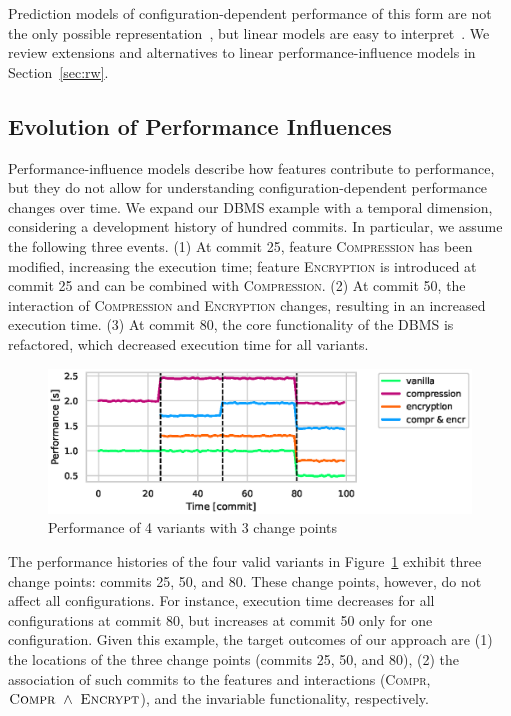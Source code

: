 \documentclass[sigconf, screen]{acmart}
\begin{document}
	Prediction models of configuration-dependent performance of this form are not the only possible representation~\cite{guoVariabilityawarePerformancePrediction2013,haDeepPerf2019}, but linear models are easy to interpret~\cite{siegmundPerformanceinfluenceModelsHighly2015}.
	We review extensions and alternatives to linear performance-influence models in Section~\ref{sec:rw}.
	
	\subsection{Evolution of Performance Influences}
	Performance-influence models describe how features contribute to performance, but they do not allow for understanding configuration-dependent performance changes over time.
	We expand our DBMS example with a temporal dimension, considering a development history of hundred commits.
	In particular, we assume the following three events. (1) At commit 25, feature \textsc{Compression} has been modified, increasing the execution time; feature \textsc{Encryption} is introduced at commit 25 and can be combined with \textsc{Compression}. (2) At commit 50, the interaction of \textsc{Compression} and \textsc{Encryption} changes, resulting in an increased execution time. (3) At commit 80, the core functionality of the DBMS is refactored, which decreased execution time for all variants.
	\begin{figure}[ht!]
		\centering
		\includegraphics[width=\linewidth]{images/dbms_performance.eps}
		\caption{Performance of 4 variants with 3 change points}
		\label{fig:dbms_performance}
	\end{figure}
	
	The performance histories of the four valid variants in Figure~\ref{fig:dbms_performance} exhibit three change points: commits 25, 50, and 80. These change points, however, do not affect all configurations.
	For  instance, execution time decreases for all configurations at commit 80, but increases at commit 50 only for one configuration.
	Given this example, the target outcomes of our approach are (1) the locations of the three change points (commits 25, 50, and 80),  (2) the association of such commits to the features and interactions (\textsc{Compr}, $\text{\textsc{Compr}}\ \land\ \text{\textsc{Encrypt}}$), and the invariable functionality, respectively.
	
\end{document}
